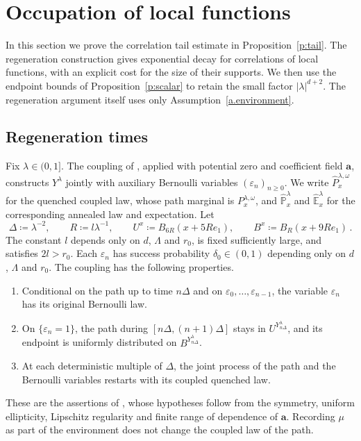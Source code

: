 \documentclass[11pt]{amsart}
\theoremstyle{definition}
\theoremstyle{remark}
\numberwithin{equation}{section}
\renewcommand{\a}{\mathbf a}
\begin{document}
\section{Occupation of local functions}\label{regen.sec}\label{s:response}

In this section we prove the correlation tail estimate in Proposition~\ref{p:tail}. The regeneration construction gives exponential decay for correlations of local functions, with an explicit cost for the size of their supports. We then use the endpoint bounds of Proposition~\ref{p:scalar} to retain the small factor $|\lambda|^{d+2}$. The regeneration argument itself uses only Assumption~\ref{a.environment}.

\subsection{Regeneration times}\label{regen.setup}

Fix $\lambda\in(0,1]$. The coupling of \citet[Proposition~5.4]{Einstein2012gantert}, applied with potential zero and coefficient field $\a$, constructs $Y^\lambda$ jointly with auxiliary Bernoulli variables $(\varepsilon_n)_{n\geq0}$. We write $\widehat P^{\lambda,\omega}_x$ for the quenched coupled law, whose path marginal is $P^{\lambda,\omega}_x$, and $\widehat{\mathbb P}^\lambda_x$ and $\widehat{\mathbb E}^\lambda_x$ for the corresponding annealed law and expectation. Let
\begin{equation}\label{regen.scales}
 \Delta\coloneqq\lambda^{-2},\qquad R\coloneqq l\lambda^{-1},\qquad
 U^x\coloneqq B_{6R}(x+5Re_1),\qquad B^x\coloneqq B_R(x+9Re_1)\, .
\end{equation}
The constant $l$ depends only on $d$, $\Lambda$ and $r_0$, is fixed sufficiently large, and satisfies $2l>r_0$. Each $\varepsilon_n$ has success probability $\delta_0\in(0,1)$ depending only on $d$, $\Lambda$ and $r_0$. The coupling has the following properties.
\begin{enumerate}
\item[(i)] Conditional on the path up to time $n\Delta$ and on $\varepsilon_0,\ldots,\varepsilon_{n-1}$, the variable $\varepsilon_n$ has its original Bernoulli law.
\item[(ii)] On $\{\varepsilon_n=1\}$, the path during $[n\Delta,(n+1)\Delta]$ stays in $U^{Y^\lambda_{n\Delta}}$, and its endpoint is uniformly distributed on $B^{Y^\lambda_{n\Delta}}$.
\item[(iii)] At each deterministic multiple of $\Delta$, the joint process of the path and the Bernoulli variables restarts with its coupled quenched law.
\end{enumerate}
These are the assertions of \citet[Proposition~5.4]{Einstein2012gantert}, whose hypotheses follow from the symmetry, uniform ellipticity, Lipschitz regularity and finite range of dependence of $\a$. Recording $\mu$ as part of the environment does not change the coupled law of the path.
\end{document}
